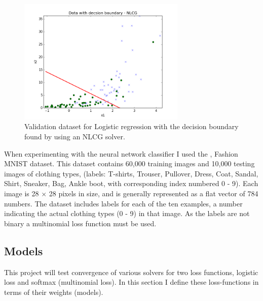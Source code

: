 \documentclass[nohyperref]{article}
\theoremstyle{plain}
\theoremstyle{definition}
\theoremstyle{remark}
\begin{document}
\begin{figure}[!ht]
\centering
\includegraphics[height=6cm, width=8cm]{../src-logistic/logReg_pred_NLCG.png}
\caption{Validation dataset for Logistic regression with the decision boundary found by using an NLCG solver.}\label{valid_dataset}
\end{figure}

When experimenting with the neural network classifier I used the \citet{FashionMNIST:data}, Fashion MNIST dataset. This dataset contains 60,000 training images and 10,000 testing images of clothing types, (labels: T-shirts, Trouser, Pullover, Dress, Coat, Sandal, Shirt, Sneaker, Bag, Ankle boot, with corresponding index numbered 0 - 9). Each image is 28 $\times$ 28 pixels in size, and is generally represented as a flat vector of 784 numbers. The dataset includes labels for each of the ten examples, a number indicating the actual clothing types (0 - 9) in that image. As the labels are not binary a multinomial loss function must be used.

\subsection{Models}   
This project will test convergence of various solvers for two loss functions, logistic loss and softmax (multinomial loss). In this section I define these loss-functions in terms of their weights (models).
\end{document}
